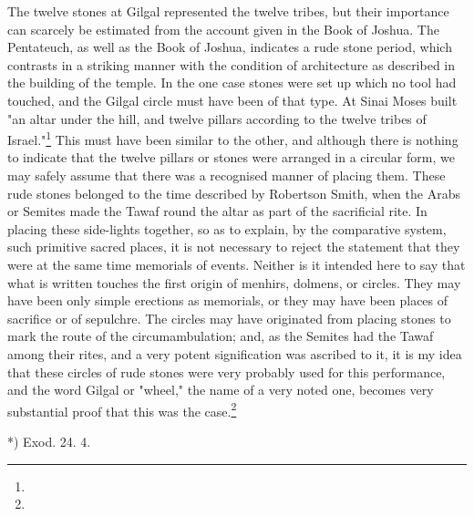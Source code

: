 \documentclass[a4paper, 11pt, oneside, polutonikogreek, english]{article}
\begin{document}
The twelve stones at Gilgal represented the twelve tribes, but their importance can scarcely be estimated from the account given in the Book of Joshua. The Pentateuch, as well as the Book of Joshua, indicates a rude stone period, which contrasts in a striking manner with the condition of architecture as described in the building of the temple. In the one case stones were set up which no tool had touched, and the Gilgal circle must have been of that type. At Sinai Moses built "an altar under the hill, and twelve pillars according to the twelve tribes of Israel."\footnote{} This must have been similar to the other, and although there is nothing to indicate that the twelve pillars or stones were arranged in a circular form, we may safely assume that there was a recognised manner of placing them. These rude stones belonged to the time described by Robertson Smith, when the Arabs or Semites made the Tawaf round the altar as part of the sacrificial rite. In placing these side-lights together, so as to explain, by the comparative system, such primitive sacred places, it is not necessary to reject the statement that they were at the same time memorials of events. Neither is it intended here to say that what is written touches the first origin of menhirs, dolmens, or circles. They may have been only simple erections as memorials, or they may have been places of sacrifice or of sepulchre. The circles may have originated from placing stones to mark the route of the circumambulation; and, as the Semites had the Tawaf among their rites, and a very potent signification was ascribed to it, it is my idea that these circles of rude stones were very probably used for this performance, and the word Gilgal or "wheel," the name of a very noted one, becomes very substantial proof that this was the case.\footnote{}

*) Exod. 24. 4.
\end{document}

